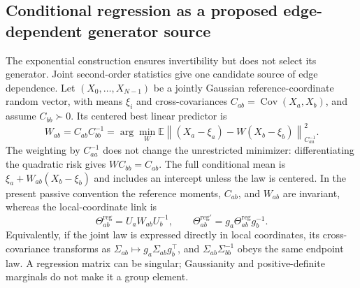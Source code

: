 \documentclass[11pt]{article}
\theoremstyle{definition}
\theoremstyle{remark}
\begin{document}
\subsection{Conditional regression as a proposed edge-dependent generator source}
\label{links:curve:sec:regression}

The exponential construction ensures invertibility but does not select its generator. Joint second-order statistics give one candidate source of edge dependence. Let $(X_0,\ldots,X_{N-1})$ be a jointly Gaussian reference-coordinate random vector, with means $\xi_i$ and cross-covariances $C_{ab}=\operatorname{Cov}(X_a,X_b)$, and assume $C_{bb}\succ0$. Its centered best linear predictor is
\begin{equation}
W_{ab}=C_{ab}C_{bb}^{-1}
=\arg\min_W\mathbb E\left\|(X_a-\xi_a)-W(X_b-\xi_b)\right\|^2_{C_{aa}^{-1}}.
\label{links:curve:eq:regression}
\end{equation}
The weighting by $C_{aa}^{-1}$ does not change the unrestricted minimizer: differentiating the quadratic risk gives $W C_{bb}=C_{ab}$. The full conditional mean is $\xi_a+W_{ab}(X_b-\xi_b)$ and includes an intercept unless the law is centered. In the present passive convention the reference moments, $C_{ab}$, and $W_{ab}$ are invariant, whereas the local-coordinate link is
\begin{equation}
\Theta^{\mathrm{reg}}_{ab}=U_aW_{ab}U_b^{-1},
\qquad \Theta^{\mathrm{reg}\prime}_{ab}=g_a\Theta^{\mathrm{reg}}_{ab}g_b^{-1}.
\label{links:curve:eq:regression_dressed}
\end{equation}
Equivalently, if the joint law is expressed directly in local coordinates, its cross-covariance transforms as $\Sigma_{ab}\mapsto g_a\Sigma_{ab}g_b^\top$, and $\Sigma_{ab}\Sigma_{bb}^{-1}$ obeys the same endpoint law. A regression matrix can be singular; Gaussianity and positive-definite marginals do not make it a group element.
\end{document}
